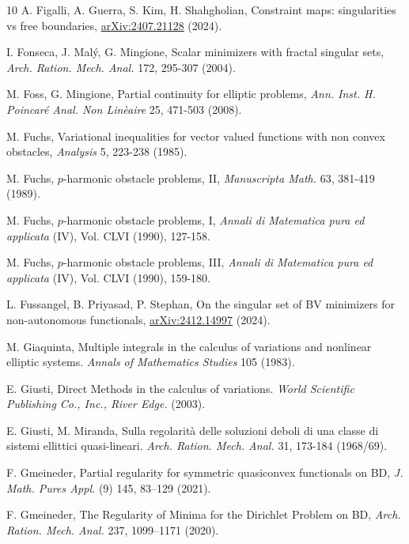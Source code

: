 \documentclass[a4paper]{amsart}
\theoremstyle{plain}  %
\numberwithin{equation}{section}
\begin{document}
\begin{thebibliography}{10}
 A. Figalli, A. Guerra, S. Kim, H. Shahgholian, Constraint maps: singularities vs free boundaries, \href{https://arxiv.org/abs/2407.21128}{arXiv:2407.21128} (2024).

 I. Fonseca, J. Malý, G. Mingione, Scalar minimizers with fractal singular sets, \emph{Arch. Ration. Mech. Anal.} 172, 295-307 (2004).  





 M. Foss, G. Mingione, 
Partial continuity for elliptic problems, \emph{Ann. Inst. H. Poincaré Anal. Non Linèaire} 25, 471-503 (2008).

M. Fuchs, Variational inequalities for vector valued functions with non convex obstacles, \emph{Analysis} 5, 223-238 (1985).

  M. Fuchs, $p$-harmonic obstacle problems, II, \emph{Manuscripta Math.} 63, 381-419 (1989).

  M. Fuchs, $p$-harmonic obstacle problems, I, \emph{Annali di Matematica pura ed applicata} (IV), Vol. CLVI (1990), 127-158. 


  M. Fuchs, $p$-harmonic obstacle problems, III, \emph{Annali di Matematica pura ed applicata} (IV), Vol. CLVI (1990), 159-180.

 L. Fussangel, B. Priyasad, P. Stephan, On the singular set of BV minimizers for non-autonomous functionals, \href{https://arxiv.org/abs/2412.14997}{	arXiv:2412.14997} (2024).


M. Giaquinta, Multiple integrals in the calculus of variations and nonlinear elliptic systems. \emph{Annals of Mathematics Studies} 105 (1983).





 E. Giusti, Direct Methods in the calculus of variations. \emph{World Scientific Publishing Co., Inc., River Edge.} (2003).

 E. Giusti, M. Miranda, Sulla regolarit\`a delle soluzioni deboli di una classe di sistemi ellittici quasi-lineari. \emph{Arch. Ration. Mech. Anal.} 31, 173-184 (1968/69).

 F. Gmeineder, Partial regularity for symmetric quasiconvex functionals on BD, \emph{J. Math. Pures Appl.} (9) 145, 83–129 (2021).

 F. Gmeineder, The Regularity of Minima for the Dirichlet Problem on BD, \emph{Arch. Ration. Mech. Anal.} 237, 1099–1171 (2020).


\end{thebibliography}
\end{document}
